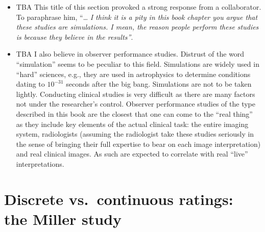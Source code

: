 \documentclass[
]{book}
\begin{document}
\begin{itemize}
\item
  TBA This title of this section provoked a strong response from a collaborator. To paraphrase him, ``\ldots{} \emph{I think it is a pity in this book chapter you argue that these studies are simulations. I mean, the reason people perform these studies is because they believe in the results''}.
\item
  TBA I also believe in observer performance studies. Distrust of the word ``simulation'' seems to be peculiar to this field. Simulations are widely used in ``hard'' sciences, e.g., they are used in astrophysics to determine conditions dating to \(10^{-31}\) seconds after the big bang. Simulations are not to be taken lightly. Conducting clinical studies is very difficult as there are many factors not under the researcher's control. Observer performance studies of the type described in this book are the closest that one can come to the ``real thing'' as they include key elements of the actual clinical task: the entire imaging system, radiologists (assuming the radiologist take these studies seriously in the sense of bringing their full expertise to bear on each image interpretation) and real clinical images. As such are expected to correlate with real ``live'' interpretations.
\end{itemize}

\hypertarget{binary-task-discrete-vs-continuous-ratings}{%
\section{Discrete vs.~continuous ratings: the Miller study}\label{binary-task-discrete-vs-continuous-ratings}}
\end{document}
